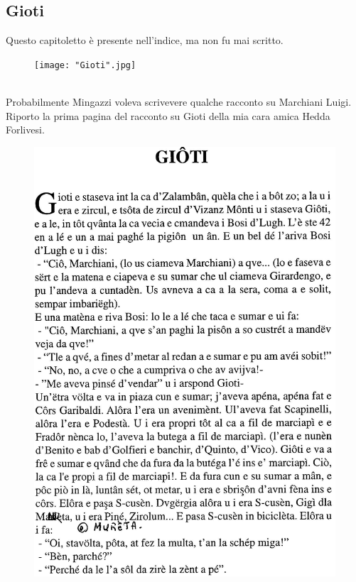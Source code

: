\subsection{Gioti}
Questo capitoletto è presente nell'indice, ma non fu mai scritto.\\
\begin{figure}[!htbp]
   \texttt{[image: "Gioti".jpg]}
\end{figure}
\\Probabilmente Mingazzi voleva scrivevere qualche racconto su Marchiani Luigi. Riporto la prima pagina del racconto su Gioti della mia cara amica Hedda Forlivesi.\\
 \begin{figure}[htb]
    \centering
    \includegraphics[width=\textwidth]{Gioti2}
\end{figure}


